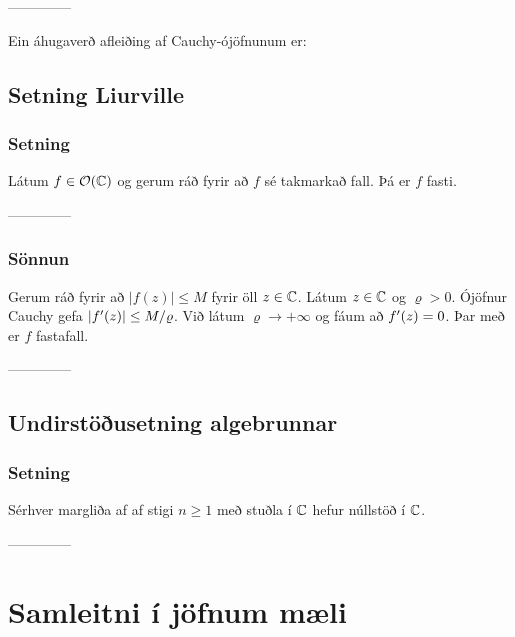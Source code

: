 --------------


Ein áhugaverð afleiðing af Cauchy-ójöfnunum er:


\subsection*{Setning Liurville}




\subsubsection{Setning} Látum $f\in {\cal O}({\mathbb C})$ og gerum ráð fyrir að
$f$ sé takmarkað fall.  Þá er $f$ fasti.  


--------------


\subsubsection{Sönnun} 
Gerum ráð fyrir að $|f(z)|\leq M$ fyrir öll $z\in {\mathbb C}$.
Látum $z\in{\mathbb C}$ og $\varrho>0$.  Ójöfnur Cauchy gefa 
 $|f{\sp{\prime}}(z)|\leq  M/\varrho$.
Við látum $\varrho\to +\infty$ og fáum að $f{\sp{\prime}}(z)=0$.
Þar með er $f$ fastafall.


--------------





\subsection*{Undirstöðusetning algebrunnar}


\subsubsection{Setning}
Sérhver margliða af af stigi $n\geq 1$ með stuðla í ${\mathbb C}$ hefur núllstöð í ${\mathbb C}$.  


--------------





\section{Samleitni í jöfnum mæli}


